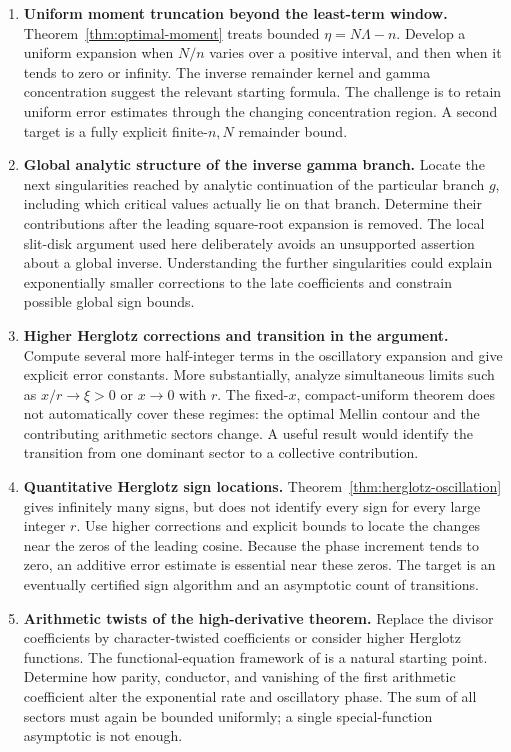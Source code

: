 \begin{enumerate}[leftmargin=*,label=\textbf{R\arabic*.},itemsep=0.65em]
\item \textbf{Uniform moment truncation beyond the least-term window.}
Theorem~\ref{thm:optimal-moment} treats bounded
\(\eta=N\Lambda-n\). Develop a uniform expansion when \(N/n\)
varies over a positive interval, and then when it tends to zero or
infinity. The inverse remainder kernel and gamma concentration
suggest the relevant starting formula. The challenge is to retain
uniform error estimates through the changing concentration region.
A second target is a fully explicit finite-\(n,N\) remainder bound.

\item \textbf{Global analytic structure of the inverse gamma branch.}
Locate the next singularities reached by analytic continuation of
the particular branch \(g\), including which critical values
actually lie on that branch. Determine their contributions after
the leading square-root expansion is removed. The local slit-disk
argument used here deliberately avoids an unsupported assertion
about a global inverse. Understanding the further singularities
could explain exponentially smaller corrections to the late
coefficients and constrain possible global sign bounds.

\item \textbf{Higher Herglotz corrections and transition in the argument.}
Compute several more half-integer terms in the oscillatory expansion
and give explicit error constants. More substantially, analyze
simultaneous limits such as \(x/r\to\xi>0\) or \(x\to0\) with \(r\).
The fixed-\(x\), compact-uniform theorem does not automatically cover
these regimes: the optimal Mellin contour and the contributing
arithmetic sectors change. A useful result would identify the
transition from one dominant sector to a collective contribution.

\item \textbf{Quantitative Herglotz sign locations.}
Theorem~\ref{thm:herglotz-oscillation} gives infinitely many signs,
but does not identify every sign for every large integer \(r\).
Use higher corrections and explicit bounds to locate the changes
near the zeros of the leading cosine. Because the phase increment
tends to zero, an additive error estimate is essential near these
zeros. The target is an eventually certified sign algorithm and an
asymptotic count of transitions.

\item \textbf{Arithmetic twists of the high-derivative theorem.}
Replace the divisor coefficients by character-twisted coefficients
or consider higher Herglotz functions. The functional-equation
framework of \cite{RZ,DSS} is a natural starting point.
Determine how parity, conductor, and vanishing of the first
arithmetic coefficient alter the exponential rate and oscillatory
phase. The sum of all sectors must again be bounded uniformly;
a single special-function asymptotic is not enough.


\end{enumerate}

